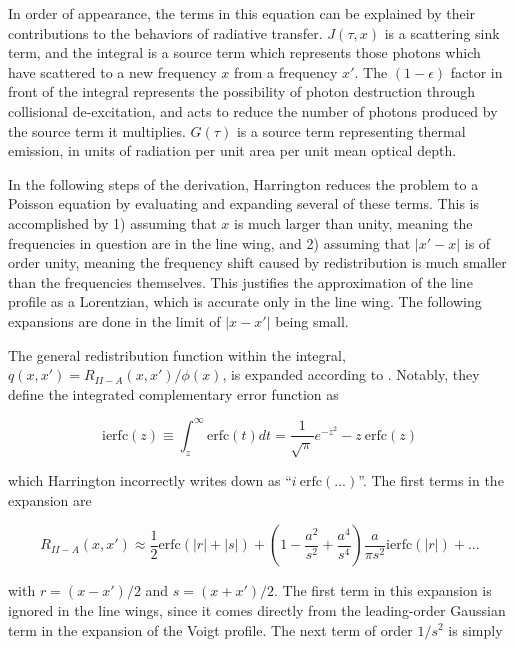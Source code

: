 \documentclass[onecolumn]{aastex63}
\begin{document}
In order of appearance, the terms in this equation can be explained by their contributions to the behaviors of radiative transfer. $J(\tau, x)$ is a scattering sink term, and the integral is a source term which represents those photons which have scattered to a new frequency $x$ from a frequency $x'$. The $(1-\epsilon)$ factor in front of the integral represents the possibility of photon destruction through collisional de-excitation, and acts to reduce the number of photons produced by the source term it multiplies. $G(\tau)$ is a source term representing thermal emission, in units of radiation per unit area per unit mean optical depth. 

In the following steps of the derivation, Harrington reduces the problem to a Poisson equation by evaluating and expanding several of these terms. This is accomplished by 1) assuming that $x$ is much larger than unity, meaning the frequencies in question are in the line wing, and 2) assuming that $|x'-x|$ is of order unity, meaning the frequency shift caused by redistribution is much smaller than the frequencies themselves. This justifies the approximation of the line profile as a Lorentzian, which is accurate only in the line wing. The following expansions are done in the limit of $|x-x'|$ being small. 

The general redistribution function within the integral, $q(x, x') = R_{II-A}(x, x')/\phi (x)$, is expanded according to \cite{1971JQSRT..11.1365A}. Notably, they define the integrated complementary error function as 

\begin{equation}
    \mathrm{ierfc}(z) \equiv \int_z^{\infty} \mathrm{erfc}(t) dt = \frac{1}{\sqrt{\pi}} e^{-z^2} - z\  \mathrm{erfc}(z)
\end{equation}

\noindent which Harrington incorrectly writes down as ``$i\ \mathrm{erfc(...)}$''. The first terms in the expansion are 

\begin{equation}
    R_{II-A}(x, x') \approx \frac{1}{2}\mathrm{erfc}(|r|+|s|) + \left(1 - \frac{a^2}{s^2} + \frac{a^4}{s^4}\right) \frac{a}{\pi s^2} \mathrm{ierfc}(|r|) + ...
\end{equation}

\noindent with $r=(x-x')/2$ and $s=(x+x')/2$. The first term in this expansion is ignored in the line wings, since it comes directly from the leading-order Gaussian term in the expansion of the Voigt profile. The next term of order $1/s^2$ is simply
\end{document}
